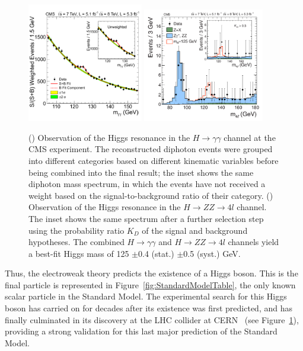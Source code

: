 \begin{figure}
   \begin{center}
      \includegraphics[width=0.45\textwidth]{figures/higgs-resonance-diphoton}
      \includegraphics[width=0.47\textwidth]{figures/higgs-resonance-ZZ4l}
      \caption{(\cmsLeft) Observation of the Higgs resonance in the $H\rightarrow\gamma\gamma$ channel at the CMS experiment. The reconstructed diphoton events were grouped into different categories based on different kinematic variables before being combined into the final result; the inset shows the same diphoton mass spectrum, in which the events have not received a weight based on the signal-to-background ratio of their category. (\cmsRight) Observation of the Higgs resonance in the $H\rightarrow ZZ\rightarrow4l$ channel. The inset shows the same spectrum after a further selection step using the probability ratio $K_{D}$ of the signal and background hypotheses. The combined $H\rightarrow\gamma\gamma$ and $H\rightarrow ZZ\rightarrow4l$ channels yield a best-fit Higgs mass of 125 $\pm$0.4 (stat.) $\pm$0.5 (syst.) GeV.~\cite{Chatrchyan:2012ufa}}
      \label{fig:higgs-resonance}
   \end{center}
\end{figure}

Thus, the electroweak theory predicts the existence of a Higgs boson. This is the final particle is represented in Figure~\ref{fig:StandardModelTable}, the only known scalar particle in the Standard Model. The experimental search for this Higgs boson has carried on for decades after its existence was first predicted, and has finally culminated in its discovery at the LHC collider at CERN~\cite{Aad:2012tfa,Chatrchyan:2012ufa} (see Figure~\ref{fig:higgs-resonance}), providing a strong validation for this last major prediction of the Standard Model.

